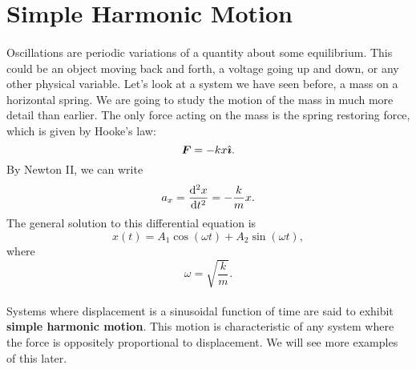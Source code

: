 \documentclass[../classical_mechanics.tex]{subfiles}
\begin{document}
    \section{Simple Harmonic Motion}
        \paragraph{}
        Oscillations are periodic variations of a quantity about some equilibrium.
        This could be an object moving back and forth, a voltage going up and down, or any other physical variable.
        Let's look at a system we have seen before, a mass on a horizontal spring.
        We are going to study the motion of the mass in much more detail than earlier.
        The only force acting on the mass is the spring restoring force, which is given by Hooke's law:
        \begin{equation}
            \boldsymbol{F}=-kx\hat{\boldsymbol{\imath}}.
        \end{equation}
        By Newton II, we can write
        \begin{equation}\label{eq:SHM-spring}
            a_x=\dv[2]{x}{t}=-\frac{k}{m}x.
        \end{equation}
        The general solution to this differential equation is
        \begin{equation}
            x(t)=A_1\cos(\omega t)+A_2\sin(\omega t),
        \end{equation}
        where
        \begin{equation}
            \omega=\sqrt{\frac{k}{m}}.
        \end{equation}

        \paragraph{}
        Systems where displacement is a sinusoidal function of time are said to exhibit \textbf{simple harmonic motion}.
        This motion is characteristic of any system where the force is oppositely proportional to displacement.
        We will see more examples of this later.
\end{document}
